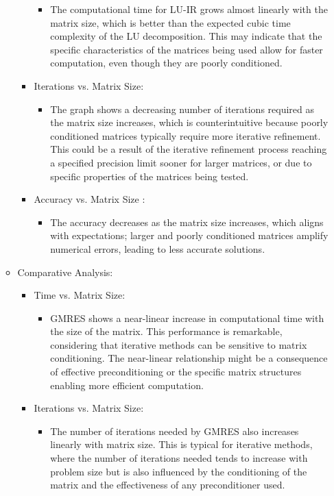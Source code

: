 \begin{enumerate}
\begin{itemize}
\begin{itemize}
\begin{itemize}
                \item The computational time for LU-IR grows almost linearly with the matrix size, which is better than the expected cubic time complexity of the LU decomposition. This may indicate that the specific characteristics of the matrices being used allow for faster computation, even though they are poorly conditioned.
            \end{itemize}
           \item Iterations vs. Matrix Size:
           \begin{itemize}
               \item The graph shows a decreasing number of iterations required as the matrix size increases, which is counterintuitive because poorly conditioned matrices typically require more iterative refinement. This could be a result of the iterative refinement process reaching a specified precision limit sooner for larger matrices, or due to specific properties of the matrices being tested.
           \end{itemize}
           \item Accuracy vs. Matrix Size :
           \begin{itemize}
               \item The accuracy decreases as the matrix size increases, which aligns with expectations; larger and poorly conditioned matrices amplify numerical errors, leading to less accurate solutions.
           \end{itemize}
        \end{itemize}
        \item Comparative Analysis:
        \begin{itemize}
            \item  Time vs. Matrix Size:
            \begin{itemize}
                \item GMRES shows a near-linear increase in computational time with the size of the matrix. This performance is remarkable, considering that iterative methods can be sensitive to matrix conditioning. The near-linear relationship might be a consequence of effective preconditioning or the specific matrix structures enabling more efficient computation.
            \end{itemize}
            \item Iterations vs. Matrix Size:
            \begin{itemize}
                \item The number of iterations needed by GMRES also increases linearly with matrix size. This is typical for iterative methods, where the number of iterations needed tends to increase with problem size but is also influenced by the conditioning of the matrix and the effectiveness of any preconditioner used.

\end{itemize}
\end{itemize}
\end{itemize}
\end{enumerate}
